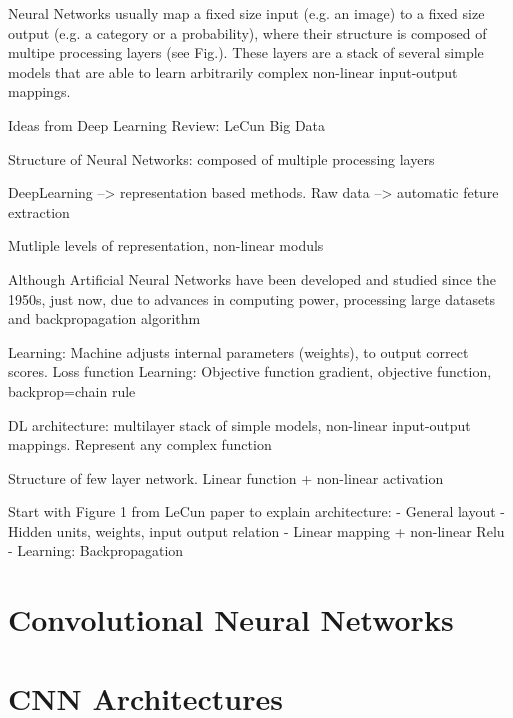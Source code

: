 Neural Networks usually map a fixed size input (e.g. an image) to a fixed size output (e.g. a category or a probability), where their structure is composed of multipe processing layers (see Fig.). These layers are a stack of several simple models that are able to learn arbitrarily complex non-linear input-output mappings.


Ideas from Deep Learning Review: LeCun
Big Data

Structure of Neural Networks: composed of multiple processing layers

DeepLearning --> representation based methods. Raw data --> automatic feture extraction

Mutliple levels of representation, non-linear moduls 

Although Artificial Neural Networks have been developed and studied since the 1950s, just now, due to advances in computing power, processing large datasets and backpropagation algorithm

Learning: Machine adjusts internal parameters (weights), to output correct scores. Loss function
Learning: Objective function gradient, objective function, backprop=chain rule

DL architecture: multilayer stack of simple models, non-linear input-output mappings. Represent any complex function

Structure of few layer network. Linear function + non-linear activation

Start with Figure 1 from LeCun paper to explain architecture:
- General layout
- Hidden units, weights, input output relation
- Linear mapping + non-linear Relu
- Learning: Backpropagation


\section{Convolutional Neural Networks}


\section{CNN Architectures}